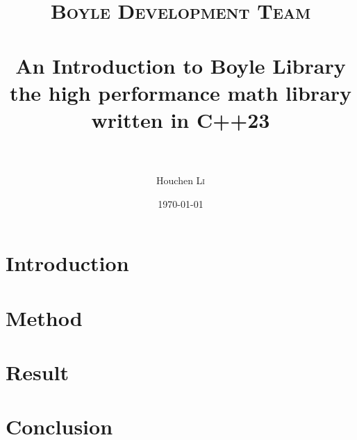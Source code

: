 \documentclass[11pt,a4paper]{article} %
\title{	
	\normalfont \normalsize 
	\textsc{Boyle Development Team} \\ [25pt] %
	\horrule{0.5pt} \\[0.4cm] %
	\huge \textbf{An Introduction to Boyle Library} \\ %
    \Large the high performance math library written in C++23 \\ %
	\horrule{2pt} \\[0.5cm] %
}
\author{Houchen \textsc{Li}} %
\date{\normalsize\today} %
\numberwithin{equation}{section} %
\numberwithin{figure}{section} %
\numberwithin{table}{section} %
\begin{document}
\maketitle %



\section{Introduction}

\lipsum[1-4]

\clearpage


\section{Method}

\lipsum[5-15]

\clearpage


\section{Result}

\lipsum[15-30]

\clearpage


\section{Conclusion}

\lipsum[30-40]

\clearpage

\end{document}
